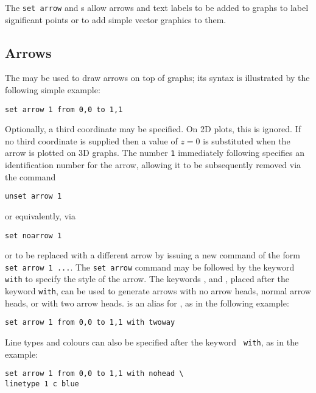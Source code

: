 The {\tt set arrow} and s allow arrows and
text labels to be added to graphs to label significant points or to add simple
vector graphics to them.

\subsection{Arrows}

\label{sec:set_arrow} The  may be used to
draw arrows on top of graphs; its syntax is illustrated by the following simple
example:

\begin{verbatim}
set arrow 1 from 0,0 to 1,1
\end{verbatim}

\noindent Optionally, a third coordinate may be specified. On 2D plots, this is
ignored. If no third coordinate is supplied then a value of $z=0$ is
substituted when the arrow is plotted on 3D graphs. The number {\tt 1}
immediately following  specifies an identification number
for the arrow, allowing it to be subsequently removed via the command

\begin{verbatim}
unset arrow 1
\end{verbatim}

\noindent or equivalently, via

\begin{verbatim}
set noarrow 1
\end{verbatim}

\noindent or to be replaced with a different arrow by issuing a new command of
the form {\tt set arrow 1~...}.  The {\tt set arrow} command may be followed by
the keyword {\tt with} to specify the style of the arrow. The keywords
,  and , placed after the
keyword {\tt with}, can be used to generate arrows with no arrow heads, normal
arrow heads, or with two arrow heads.   is an alias for
, as in the following example:

\begin{verbatim}
set arrow 1 from 0,0 to 1,1 with twoway
\end{verbatim}

\noindent Line types and colours can also be specified after the keyword {\tt
with}, as in the example:

\begin{verbatim}
set arrow 1 from 0,0 to 1,1 with nohead \
linetype 1 c blue
\end{verbatim}

